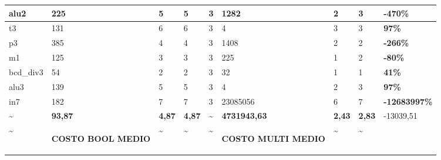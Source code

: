 \documentclass[
]{book}
\begin{document}
\begin{table}
\begin{tabular}{|l|l|l|l|l|l|l|l|l|}
\hline
alu2                 & 225                                                     & 5                     & 5                   & 3                       & 1282                                                     & 2                     & 3                   & \textbf{-470\% }       \\ 
\hline
t3                   & 131                                                     & 6                     & 6                   & 3                       & 4                                                        & 3                     & 3                   & \textbf{97\% }         \\ 
\hline
p3                   & 385                                                     & 4                     & 4                   & 3                       & 1408                                                     & 2                     & 2                   & \textbf{-266\% }       \\ 
\hline
m1                   & 125                                                     & 3                     & 3                   & 3                       & 225                                                      & 1                     & 2                   & \textbf{-80\% }        \\ 
\hline
bcd\_div3            & 54                                                      & 2                     & 2                   & 3                       & 32                                                       & 1                     & 1                   & \textbf{41\% }         \\ 
\hline
alu3                 & 139                                                     & 5                     & 5                   & 3                       & 4                                                        & 2                     & 3                   & \textbf{97\% }         \\ 
\hline
in7                  & 182                                                     & 7                     & 7                   & 3                       & 23085056                                                 & 6                     & 7                   & \textbf{-12683997\% }  \\ 
\hline
\textasciitilde{}    & \textbf{93,87}                                          & \textbf{4,87}         & \textbf{4,87}       & \textasciitilde{}       & \textbf{4731943,63}                                      & \textbf{2,43}         & \textbf{2,83}       & -13039,51              \\ 
\hline
\textasciitilde{}    & \begin{sideways}\textbf{COSTO BOOL MEDIO}\end{sideways} & \textasciitilde{}     & \textasciitilde{}   & \textasciitilde{}       & \begin{sideways}\textbf{COSTO MULTI MEDIO}\end{sideways} & \textasciitilde{}     & \textasciitilde{}   &                        \\
\hline
\end{tabular}
\end{table}
\end{document}
